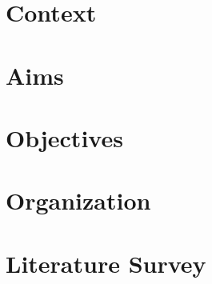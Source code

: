 \section{Context}
\section{Aims}
\section{Objectives}
\section{Organization}
\section{Literature Survey}